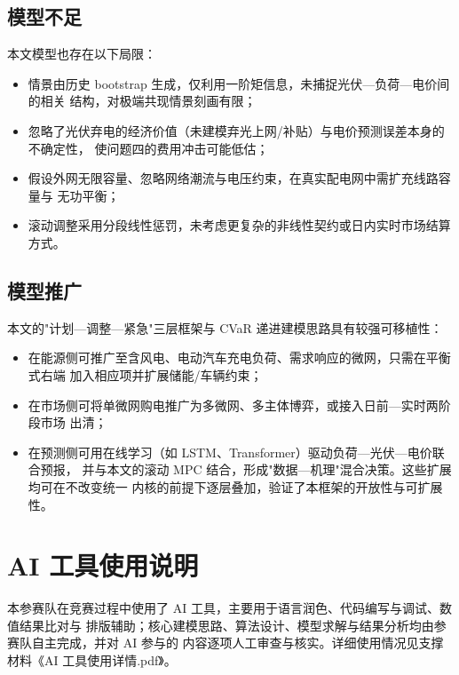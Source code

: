 \documentclass[withoutpreface]{cumcmthesis}
\begin{document}
\subsection{模型不足}
本文模型也存在以下局限：
\begin{itemize}
    \item 情景由历史 bootstrap 生成，仅利用一阶矩信息，未捕捉光伏—负荷—电价间的相关
          结构，对极端共现情景刻画有限；
    \item 忽略了光伏弃电的经济价值（未建模弃光上网/补贴）与电价预测误差本身的不确定性，
          使问题四的费用冲击可能低估；
    \item 假设外网无限容量、忽略网络潮流与电压约束，在真实配电网中需扩充线路容量与
          无功平衡；
    \item 滚动调整采用分段线性惩罚，未考虑更复杂的非线性契约或日内实时市场结算方式。
\end{itemize}

\subsection{模型推广}
本文的"计划—调整—紧急"三层框架与 CVaR 递进建模思路具有较强可移植性：
\begin{itemize}
    \item 在能源侧可推广至含风电、电动汽车充电负荷、需求响应的微网，只需在平衡式右端
          加入相应项并扩展储能/车辆约束；
    \item 在市场侧可将单微网购电推广为多微网、多主体博弈，或接入日前—实时两阶段市场
          出清；
    \item 在预测侧可用在线学习（如 LSTM、Transformer）驱动负荷—光伏—电价联合预报，
          并与本文的滚动 MPC 结合，形成"数据—机理"混合决策。这些扩展均可在不改变统一
          内核的前提下逐层叠加，验证了本框架的开放性与可扩展性。
\end{itemize}

\section*{AI 工具使用说明}
本参赛队在竞赛过程中使用了 AI 工具，主要用于语言润色、代码编写与调试、数值结果比对与
排版辅助；核心建模思路、算法设计、模型求解与结果分析均由参赛队自主完成，并对 AI 参与的
内容逐项人工审查与核实。详细使用情况见支撑材料《AI 工具使用详情.pdf》。
\end{document}

